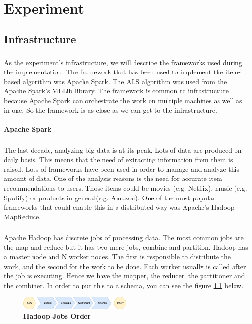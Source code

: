 \chapter{Experiment}
\section{Infrastructure}
\paragraph{}As the experiment's infrastructure, we will describe the frameworks used during the implementation. The framework that has been used to implement the item-based algorithm was Apache Spark. The ALS algorithm was used from the Apache Spark's MLLib library. The framework is common to infrastructure because Apache Spark can orchestrate the work on multiple machines as well as in one. So the framework is as close as we can get to the infrastructure.

\subsubsection{Apache Spark}
\paragraph{}The last decade, analyzing big data is at its peak. Lots of data are produced on daily basis. This means that the need of extracting information from them is raised. 
Lots of frameworks have been used in order to manage and analyze this amount of data. One of the analysis reasons is the need for accurate item recommendations to users. Those items could be movies (e.g. Netflix), music (e.g. Spotify) or products in general(e.g. Amazon). One of the most popular frameworks that could enable this in a distributed way was Apache's Hadoop MapReduce.


\paragraph{}Apache Hadoop has discrete jobs of processing data. The most common jobs are the map and reduce but it has two more jobs, combine and partition. Hadoop has a master node and N worker nodes. The first is responsible to distribute the work, and the second for the work to be done. Each worker usually is called after the job is executing. Hence we have the mapper, the reducer, the partitioner and the combiner. In order to put this to a schema, you can see the figure \ref{hadoopJobsOrder} below.
\\
\begin{figure}[h]
	\centering
	\includegraphics[width=0.5\textwidth]{../images/HadoopMapReduceProcesses.png}
	\caption{\bfseries Hadoop Jobs Order}
	\label{hadoopJobsOrder}
\end{figure}

